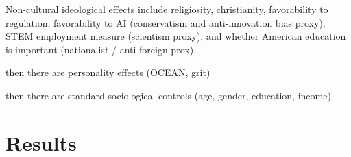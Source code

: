 \documentclass[review]{elsarticle}
\begin{document}
Non-cultural ideological effects include religiosity,
christianity,
favorability to regulation,
favorability to AI (conservatism and anti-innovation bias proxy),
STEM employment measure (scientism proxy),
and whether American education is important (nationalist / anti-foreign prox)

then there are personality effects (OCEAN, grit)

then there are standard sociological controls (age, gender, education, income)

\section{Results}

\end{document}
